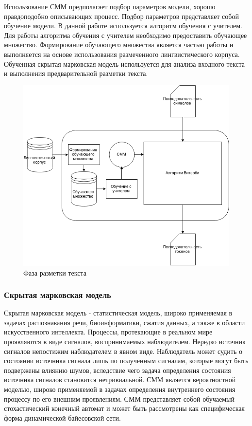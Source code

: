 Использование СММ предполагает подбор параметров модели, хорошо правдоподобно описывающих процесс. Подбор параметров представляет собой обучение модели. В данной работе используется алгоритм обучения с учителем. Для работы алгоритма обучения с учителем необходимо предоставить обучающее множество. Формирование обучающего множества является частью работы и выполняется на основе использования размеченного лингвистического корпуса. Обученная скрытая марковская модель используется для анализа входного текста и выполнения предварительной разметки текста.

\begin{figure}[H]
	\centering
	\includegraphics[scale=0.7]{img/tokenization.png}
	\caption{Фаза разметки текста}
\end{figure}

\subsubsection{Скрытая марковская модель}
Скрытая марковская модель - статистическая модель, широко применяемая в задачах распознавания речи, биоинформатики, сжатия данных, а также в области искусственного интеллекта. Процессы, протекающие в реальном мире проявляются в виде сигналов, воспринимаемых наблюдателем. Нередко источник сигналов непостижим наблюдателем в явном виде. Наблюдатель может судить о состоянии источника сигнала лишь по полученным сигналам, которые могут быть подвержены влиянию шумов, вследствие чего задача определения состояния источника сигналов становится нетривиальной. СММ является вероятностной моделью, широко применяемой в задачах определения внутреннего состояния процессу по его внешним проявлениям. СММ представляет собой обучаемый стохастический конечный автомат и может быть рассмотрены как специфическая форма динамической байесовской сети.

